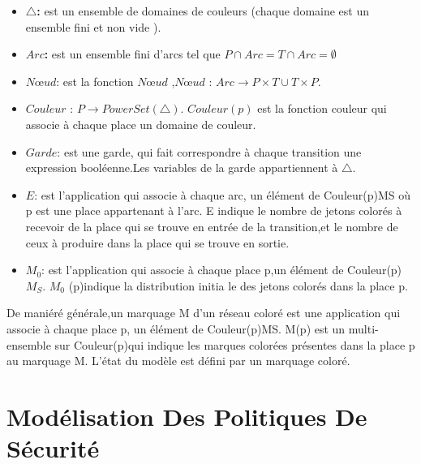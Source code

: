 \begin{itemize}
\item\textbf{ $\bigtriangleup$:}  est un ensemble de domaines de couleurs (chaque domaine est un ensemble fini et non vide ).
\item \textbf{$ Arc $:} est un ensemble fini d'arcs tel que $P \cap Arc = T \cap Arc = \emptyset $
\item \textbf{$Nœud$}:  est la fonction $Nœud$ ,$Nœud$ : $Arc \longrightarrow	P \times T \cup T \times P $.

\item   \textbf{$ Couleur $} : $P \longrightarrow PowerSet(\bigtriangleup)$. $Couleur(p)$ est la fonction couleur qui associe à chaque place un domaine de couleur.

\item \textbf{$ Garde $}: est une garde, qui fait correspondre à chaque transition une expression booléenne.Les variables de la garde appartiennent à $\bigtriangleup$.
\item \textbf{$ E $}: est l'application qui associe à chaque arc, un élément de Couleur(p)MS où p est une place appartenant à l'arc. E indique le nombre de jetons colorés à recevoir de la place qui se trouve en entrée de la transition,et le nombre de ceux à produire dans la place qui se trouve en sortie. 

\item \textbf{$ M_{0} $}: est l'application qui associe à chaque place p,un élément de Couleur(p) $ M_{S} $. $ M_{0}$ (p)indique la distribution initia le des jetons colorés dans la place p.

\end{itemize}
 
 
 
De maniéré générale,un marquage M d’un réseau coloré est une application qui associe à chaque place p, un élément de Couleur(p)MS. M(p) est un multi-ensemble sur Couleur(p)qui indique les marques colorées présentes dans la place p au marquage M. L'état du modèle est défini par un marquage coloré.


\section{Modélisation Des Politiques De Sécurité}

